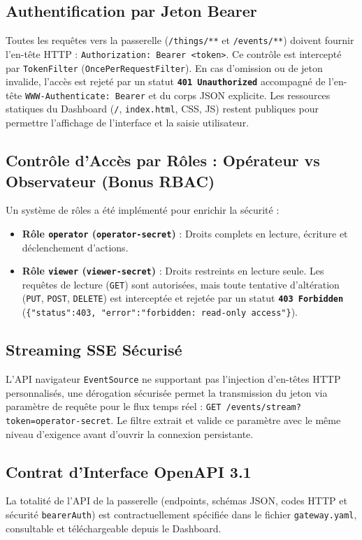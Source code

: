 \documentclass[10pt,a4paper]{article}
\begin{document}
\subsection{Authentification par Jeton Bearer}
Toutes les requêtes vers la passerelle (\texttt{/things/**} et \texttt{/events/**}) doivent fournir l'en-tête HTTP :
\texttt{Authorization: Bearer <token>}. Ce contrôle est intercepté par \texttt{TokenFilter} (\texttt{OncePerRequestFilter}). En cas d'omission ou de jeton invalide, l'accès est rejeté par un statut \textbf{\texttt{401 Unauthorized}} accompagné de l'en-tête \texttt{WWW-Authenticate: Bearer} et du corps JSON explicite. Les ressources statiques du Dashboard (\texttt{/}, \texttt{index.html}, CSS, JS) restent publiques pour permettre l'affichage de l'interface et la saisie utilisateur.

\subsection{Contrôle d'Accès par Rôles : Opérateur vs Observateur (Bonus RBAC)}
Un système de rôles a été implémenté pour enrichir la sécurité :
\begin{itemize}
  \item \textbf{Rôle \texttt{operator} (\texttt{operator-secret})} : Droits complets en lecture, écriture et déclenchement d'actions.
  \item \textbf{Rôle \texttt{viewer} (\texttt{viewer-secret})} : Droits restreints en lecture seule. Les requêtes de lecture (\texttt{GET}) sont autorisées, mais toute tentative d'altération (\texttt{PUT}, \texttt{POST}, \texttt{DELETE}) est interceptée et rejetée par un statut \textbf{\texttt{403 Forbidden}} (\texttt{\{"status":403, "error":"forbidden: read-only access"\}}).
\end{itemize}

\subsection{Streaming SSE Sécurisé}
L'API navigateur \texttt{EventSource} ne supportant pas l'injection d'en-têtes HTTP personnalisés, une dérogation sécurisée permet la transmission du jeton via paramètre de requête pour le flux temps réel : \texttt{GET /events/stream?token=operator-secret}. Le filtre extrait et valide ce paramètre avec le même niveau d'exigence avant d'ouvrir la connexion persistante.

\subsection{Contrat d'Interface OpenAPI 3.1}
La totalité de l'API de la passerelle (endpoints, schémas JSON, codes HTTP et sécurité \texttt{bearerAuth}) est contractuellement spécifiée dans le fichier \texttt{gateway.yaml}, consultable et téléchargeable depuis le Dashboard.
\end{document}
